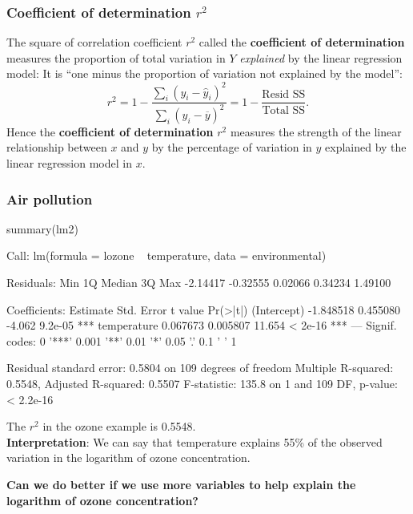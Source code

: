 \documentclass[a4paper]{article}
\begin{document}
\subsubsection{Coefficient of determination \( r^2 \)}
The square of correlation coefficient \( r^2 \) called the \textbf{coefficient of determination} measures the proportion of total variation in \( Y \) \textit{explained} by the linear regression model:
It is ``one minus the proportion of variation not explained by the model'':
\[
	r^2 = 1 - \frac{\sum_i (y_i -\hat y_i)^2}{\sum_i (y_i-\overline{y})^2} = 1 - \frac{\text{Resid SS}}{\text{Total SS}}.
\]
Hence the \textbf{coefficient of determination} \( r^2 \) measures the strength of the linear relationship between \( x \) and \( y \) by the percentage of variation in \( y \) explained by the linear regression model in \( x \).
\subsubsection{Air pollution}
\begin{Schunk}
\begin{Sinput}
summary(lm2)
\end{Sinput}
\begin{Soutput}

Call:
lm(formula = lozone ~ temperature, data = environmental)

Residuals:
     Min       1Q   Median       3Q      Max 
-2.14417 -0.32555  0.02066  0.34234  1.49100 

Coefficients:
             Estimate Std. Error t value Pr(>|t|)    
(Intercept) -1.848518   0.455080  -4.062  9.2e-05 ***
temperature  0.067673   0.005807  11.654  < 2e-16 ***
---
Signif. codes:  0 '***' 0.001 '**' 0.01 '*' 0.05 '.' 0.1 ' ' 1

Residual standard error: 0.5804 on 109 degrees of freedom
Multiple R-squared:  0.5548,	Adjusted R-squared:  0.5507 
F-statistic: 135.8 on 1 and 109 DF,  p-value: < 2.2e-16
\end{Soutput}
\end{Schunk}
The \( r^2 \) in the ozone example is 0.5548.\\
\textbf{Interpretation}: We can say that temperature explains 55\% of the observed variation in the logarithm of ozone concentration.
\begin{greenbox}
	\textbf{Can we do better if we use more variables to help explain the logarithm of ozone concentration?}
\end{greenbox}
\end{document}
